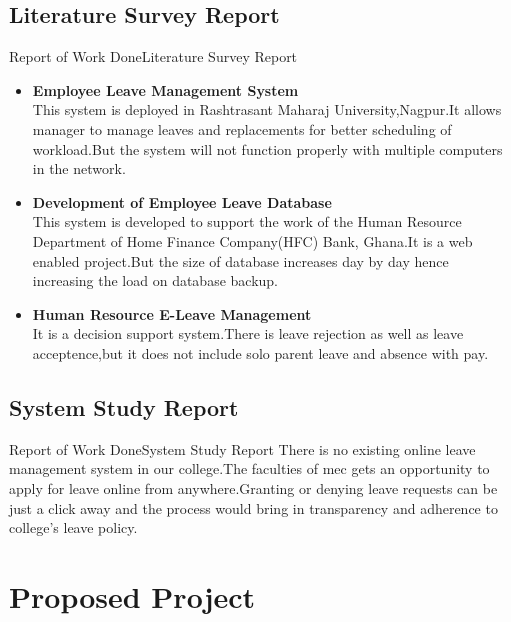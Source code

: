 \documentclass[default]{beamer}
\begin{document}
		\subsection{Literature Survey Report}	%
		\begin{frame}{Report of Work Done}{Literature Survey Report}
		\begin{itemize}
		\item \textbf{Employee Leave Management System}
		\\ This system is deployed in Rashtrasant Maharaj University,Nagpur.It allows manager to manage leaves and replacements for better scheduling	of workload.But the system will not function properly with multiple computers in the network.
		
		\item \textbf{Development of Employee Leave Database }
		\\ This system is developed to support the work of the Human Resource Department of Home Finance Company(HFC) Bank, Ghana.It is a web enabled project.But the size of database increases day by day hence increasing the load on database backup.
			
		\item \textbf{Human Resource E-Leave Management }
		\\It is a decision support system.There is leave rejection as well as leave acceptence,but it does not include solo parent leave and absence with pay.
		
		\end{itemize}
		\end{frame}
		
		\subsection{System Study Report} %
		\begin{frame}{Report of Work Done}{System Study Report}
		There is no existing online leave management system in our college.The faculties of mec gets an opportunity to apply for leave online from anywhere.Granting or denying leave requests can be just a click away and the process would bring in transparency and adherence to college's leave policy.
		\end{frame}
	
	\section{Proposed Project} %
\end{document}
